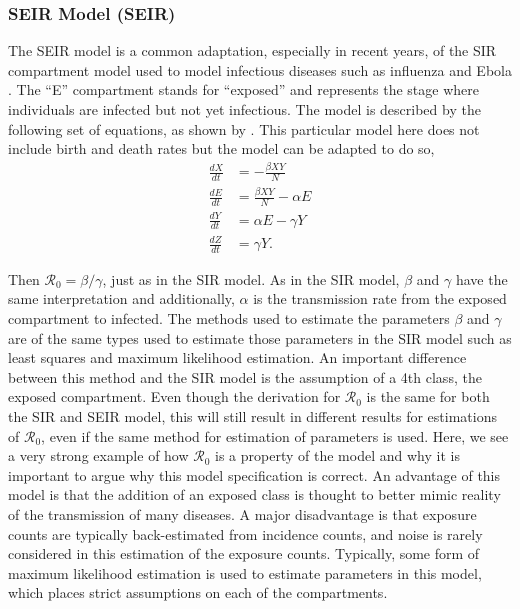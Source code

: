 \documentclass[12pt]{article}
\newcommand{\rr}{\ensuremath{\mathcal{R}_0}}
\begin{document}
\subsubsection{SEIR Model (SEIR)}
\label{sec:seir-model}

The SEIR model is a common adaptation, especially in recent years, of the SIR compartment model used to model infectious diseases such as influenza and Ebola \citep{mills2004,althaus2014}.  The ``E'' compartment stands for ``exposed'' and represents the stage where individuals are infected but not yet infectious.  The model is described by the following set of equations, as shown by \cite{cintronarias2009}.  This particular model here does not include birth and death rates but the model can be adapted to do so,
\begin{align*}
  \frac{dX}{dt} &= - \frac{\beta XY}{N} \\
  \frac{dE}{dt} &= \frac{\beta XY}{N}  - \alpha E\\
  \frac{dY}{dt} &= \alpha E - \gamma Y \\
  \frac{dZ}{dt} &= \gamma Y.
\end{align*}

Then $\rr = \beta / \gamma$, just as in the SIR model.  As in the SIR model, $\beta$ and $\gamma$ have the same interpretation and additionally, $\alpha$ is the transmission rate from the exposed compartment to infected.  The methods used to estimate the parameters $\beta$ and $\gamma$ are of the same types used to estimate those parameters in the SIR model such as least squares and maximum likelihood estimation.  An important difference between this method and the SIR model is the assumption of a 4th class, the exposed compartment.  Even though the derivation for $\rr$ is the same for both the SIR and SEIR model, this will still result in different results for estimations of $\rr$, even if the same method for estimation of parameters is used.  Here, we see a very strong example of how $\rr$ is a property of the model and why it is important to argue why this model specification is correct.  An advantage of this model is that the addition of an exposed class is thought to better mimic reality of the transmission of many diseases.  A major disadvantage is that exposure counts are typically back-estimated from incidence counts, and noise is rarely considered in this estimation of the exposure counts.   Typically, some form of maximum likelihood estimation is used to estimate parameters in this model, which places strict assumptions on each of the compartments.
\end{document}
